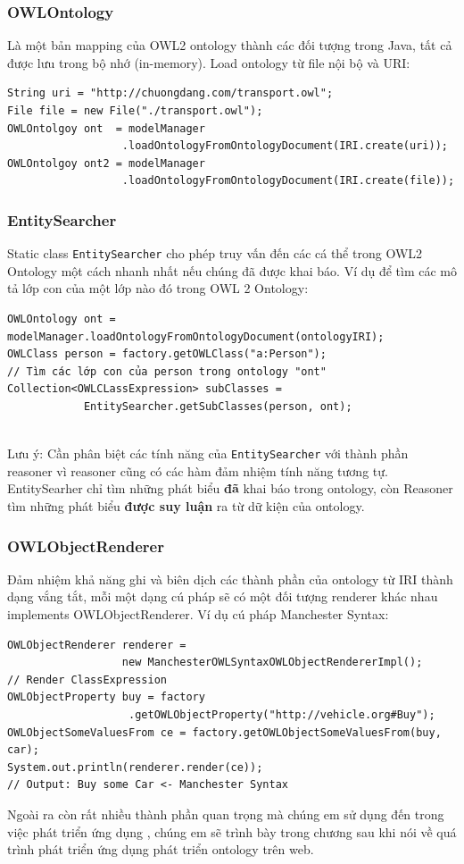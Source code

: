 \subsubsection{OWLOntology}
Là một bản mapping của OWL2 ontology thành các đối tượng trong Java, tất cả được lưu trong bộ nhớ (in-memory). Load ontology từ file nội bộ và URI:
\begin{verbatim}
String uri = "http://chuongdang.com/transport.owl";
File file = new File("./transport.owl");
OWLOntolgoy ont  = modelManager
                  .loadOntologyFromOntologyDocument(IRI.create(uri));
OWLOntolgoy ont2 = modelManager
                  .loadOntologyFromOntologyDocument(IRI.create(file));
\end{verbatim}
\subsubsection{EntitySearcher}
Static class \verb|EntitySearcher| cho phép truy vấn đến các cá thể trong OWL2 Ontology một cách nhanh nhất nếu chúng đã được khai báo. Ví dụ để tìm các mô tả lớp con của một lớp nào đó trong OWL 2 Ontology:
\begin{verbatim}
OWLOntology ont = modelManager.loadOntologyFromOntologyDocument(ontologyIRI);
OWLClass person = factory.getOWLClass("a:Person");
// Tìm các lớp con của person trong ontology "ont"
Collection<OWLCLassExpression> subClasses = 
			EntitySearcher.getSubClasses(person, ont);
			
\end{verbatim}
Lưu ý: Cần phân biệt các tính năng của \verb|EntitySearcher| với thành phần reasoner vì reasoner cũng có các hàm đảm nhiệm tính năng tương tự. EntitySearher chỉ tìm những phát biểu \textbf{đã} khai báo trong ontology, còn Reasoner tìm những phát biểu \textbf{được suy luận} ra từ dữ kiện của ontology.

\subsubsection{OWLObjectRenderer}
Đảm nhiệm khả năng ghi và biên dịch các thành phần của ontology từ IRI thành dạng vắng tắt, mỗi một dạng cú pháp sẽ có một đối tượng renderer khác nhau implements OWLObjectRenderer. Ví dụ cú pháp Manchester Syntax:
\begin{verbatim}
OWLObjectRenderer renderer = 
                  new ManchesterOWLSyntaxOWLObjectRendererImpl();
// Render ClassExpression
OWLObjectProperty buy = factory
                   .getOWLObjectProperty("http://vehicle.org#Buy");
OWLObjectSomeValuesFrom ce = factory.getOWLObjectSomeValuesFrom(buy, car);
System.out.println(renderer.render(ce));
// Output: Buy some Car <- Manchester Syntax
\end{verbatim}
Ngoài ra còn rất nhiều thành phần quan trọng mà chúng em sử dụng đến trong việc phát triển ứng dụng , chúng em sẽ trình bày trong chương sau khi nói về quá trình phát triển ứng dụng phát triển ontology trên web.
